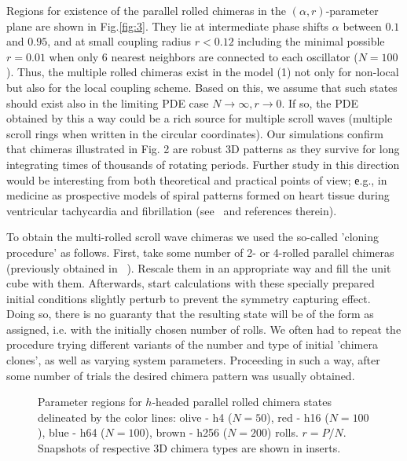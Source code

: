 \documentclass[epjST]{svjour}
\begin{document}
Regions for existence of the parallel rolled chimeras  in the $(\alpha,r)$-parameter plane are shown in Fig.\ref{fig:3}.  They lie at intermediate phase shifts  $\alpha$  between $0.1$ and $0.95$,  and at small coupling radius $r<0.12$ including the minimal possible $r=0.01$   when only 6 nearest neighbors are connected to each oscillator ($N=100$).  Thus, the multiple rolled chimeras exist in the model (1) not only for non-local but also for the local coupling scheme. Based on this, we assume that  such states should exist also in the limiting PDE case $N\rightarrow\infty, r\rightarrow 0$.  If so, the PDE obtained by this a way could be a rich source for multiple scroll waves (multiple scroll rings when written in the circular coordinates).  Our simulations confirm that chimeras illustrated in Fig. 2 are robust 3D patterns as they survive for long integrating times of  thousands of rotating periods.  Further study in this direction would be interesting from both theoretical and practical points of view;  е.g.,  in medicine as prospective models of spiral patterns formed on heart tissue during
ventricular tachycardia and fibrillation (see~\cite{pa2015,msom2015} and references therein).


To obtain the multi-rolled scroll wave chimeras we used the so-called 'cloning procedure' as follows. First, take some number of 2- or 4-rolled parallel chimeras (previously obtained in ~\cite{msom2015}). Rescale them in an appropriate way and fill the unit cube with them. Afterwards, start calculations with these specially prepared initial conditions slightly perturb to prevent the symmetry capturing effect. Doing so,  there is no guaranty that the resulting state will be of the form as assigned,  i.e. with the initially chosen number of rolls. We often had to repeat the procedure trying different variants of the number and type of initial 'chimera clones', as well as varying system parameters. Proceeding in such a way,  after some number of trials the desired chimera pattern was usually obtained. 

\begin{figure}[h]\sidecaption
{}
\caption{Parameter regions for $h$-headed parallel rolled chimera states delineated by the color lines: olive - h4 ($N=50$), red - h16 ($N=100$), blue - h64 ($N=100$), brown - h256 ($N=200$) rolls. 
  $r = P/N$. Snapshots of respective 3D chimera types are shown in inserts.}
  \label{fig:4} 
\end{figure}
\end{document}
